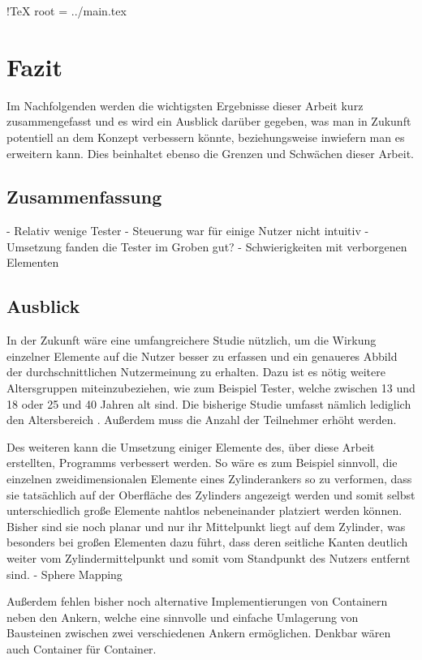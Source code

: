  !TeX root = ../main.tex

\chapter{Fazit}\label{chapter:conclusion}

	Im Nachfolgenden werden die wichtigsten Ergebnisse dieser Arbeit kurz zusammengefasst und es wird ein Ausblick darüber gegeben, was man in Zukunft potentiell an dem Konzept verbessern könnte, beziehungsweise inwiefern man es erweitern kann. Dies beinhaltet ebenso die Grenzen und Schwächen dieser Arbeit.

	\section{Zusammenfassung}
		- Relativ wenige Tester
		- Steuerung war für einige Nutzer nicht intuitiv
		- Umsetzung fanden die Tester im Groben gut?
		- Schwierigkeiten mit verborgenen Elementen
	
	\section{Ausblick}
		
		In der Zukunft wäre eine umfangreichere Studie nützlich, um die Wirkung einzelner Elemente auf die Nutzer besser zu erfassen und ein genaueres Abbild der durchschnittlichen Nutzermeinung zu erhalten. Dazu ist es nötig weitere Altersgruppen miteinzubeziehen, wie zum Beispiel Tester, welche zwischen 13 und 18 oder 25 und 40 Jahren alt sind. Die bisherige Studie umfasst nämlich lediglich den Altersbereich . Außerdem muss die Anzahl der Teilnehmer erhöht werden.
		
		
		Des weiteren kann die Umsetzung einiger Elemente des, über diese Arbeit erstellten, Programms verbessert werden. So wäre es zum Beispiel sinnvoll, die einzelnen zweidimensionalen Elemente  eines Zylinderankers so zu verformen, dass sie tatsächlich auf der Oberfläche des Zylinders angezeigt werden und somit selbst unterschiedlich große Elemente nahtlos nebeneinander platziert werden können. Bisher sind sie noch planar und nur ihr Mittelpunkt  liegt auf dem Zylinder, was besonders bei großen Elementen dazu führt, dass deren seitliche Kanten deutlich weiter vom Zylindermittelpunkt und somit vom Standpunkt des Nutzers entfernt sind.
		- Sphere Mapping
		
		
		Außerdem fehlen bisher noch alternative Implementierungen von Containern neben den Ankern, welche eine sinnvolle und einfache Umlagerung von Bausteinen zwischen zwei verschiedenen Ankern ermöglichen. Denkbar wären auch Container für Container.
				
